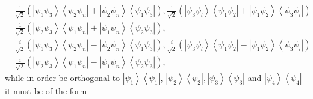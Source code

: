 \documentclass[aps,preprint]{revtex4}%
\begin{document}
\begin{align}
&  \frac{1}{\sqrt{2}}\left(  \left\vert \psi_{1}\psi_{3}\right\rangle
\left\langle \psi_{2}\psi_{n}\right\vert +\left\vert \psi_{2}\psi
_{n}\right\rangle \left\langle \psi_{1}\psi_{3}\right\vert \right)  ,\frac
{1}{\sqrt{2}}\left(  \left\vert \psi_{3}\psi_{l}\right\rangle \left\langle
\psi_{1}\psi_{2}\right\vert +\left\vert \psi_{1}\psi_{2}\right\rangle
\left\langle \psi_{3}\psi_{l}\right\vert \right) \nonumber\\
&  \frac{1}{\sqrt{2}}\left(  \left\vert \psi_{2}\psi_{3}\right\rangle
\left\langle \psi_{1}\psi_{n}\right\vert +\left\vert \psi_{1}\psi
_{n}\right\rangle \left\langle \psi_{2}\psi_{3}\right\vert \right)
,\nonumber\\
&  \frac{i}{\sqrt{2}}\left(  \left\vert \psi_{1}\psi_{3}\right\rangle
\left\langle \psi_{2}\psi_{n}\right\vert -\left\vert \psi_{2}\psi
_{n}\right\rangle \left\langle \psi_{1}\psi_{3}\right\vert \right)  ,\frac
{i}{\sqrt{2}}\left(  \left\vert \psi_{3}\psi_{l}\right\rangle \left\langle
\psi_{1}\psi_{2}\right\vert -\left\vert \psi_{1}\psi_{2}\right\rangle
\left\langle \psi_{3}\psi_{l}\right\vert \right) \nonumber\\
&  \frac{i}{\sqrt{2}}\left(  \left\vert \psi_{2}\psi_{3}\right\rangle
\left\langle \psi_{1}\psi_{n}\right\vert -\left\vert \psi_{1}\psi
_{n}\right\rangle \left\langle \psi_{2}\psi_{3}\right\vert \right)  ,
\end{align}
while in order be orthogonal to $\left\vert \psi_{1}\right\rangle \left\langle
\psi_{1}\right\vert $, $\left\vert \psi_{2}\right\rangle \left\langle \psi
_{2}\right\vert ,\left\vert \psi_{3}\right\rangle \left\langle \psi
_{3}\right\vert $ and $\left\vert \psi_{4}\right\rangle \left\langle \psi
_{4}\right\vert $ it must be of the form%
\end{document}
